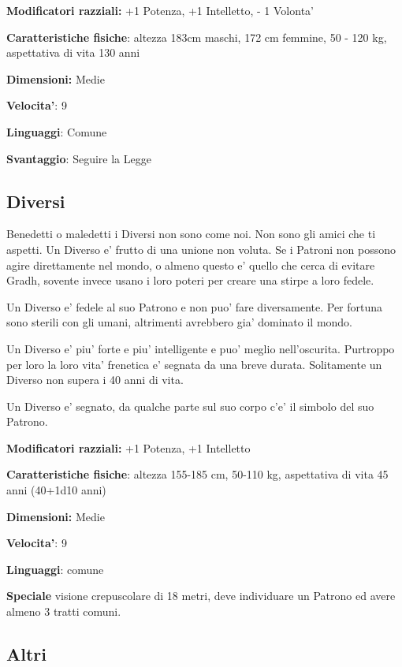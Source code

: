\documentclass[a4paper,11pt,twoside,openany]{book}
\begin{document}
\textbf{Modificatori razziali:} +1 Potenza, +1 Intelletto, - 1 Volonta'

\textbf{Caratteristiche fisiche}: altezza 183cm maschi, 172 cm femmine, 50 - 120 kg, aspettativa di vita 130 anni

\textbf{Dimensioni:} Medie

\textbf{Velocita'}: 9

\textbf{Linguaggi}: Comune

\textbf{Svantaggio}: Seguire la Legge

\subsection{Diversi}

\label{diversi}

Benedetti o maledetti i Diversi non sono come noi. Non sono gli amici che ti aspetti. Un Diverso e' frutto di una unione non voluta. Se i Patroni non possono agire direttamente nel mondo, o almeno questo e' quello che cerca di evitare Gradh, sovente invece usano i loro poteri per creare una stirpe a loro fedele.

Un Diverso e' fedele al suo Patrono e non puo' fare diversamente. Per fortuna sono sterili con gli umani, altrimenti avrebbero gia' dominato il mondo.

Un Diverso e' piu' forte e piu' intelligente e puo' meglio nell'oscurita. Purtroppo per loro la loro vita' frenetica e' segnata da una breve durata. Solitamente un Diverso non supera i 40 anni di vita.

Un Diverso e' segnato, da qualche parte sul suo corpo c'e' il simbolo del suo Patrono.

\textbf{Modificatori razziali:} +1 Potenza, +1 Intelletto

\textbf{Caratteristiche fisiche}: altezza 155-185 cm, 50-110 kg, aspettativa di vita 45 anni (40+1d10 anni)

\textbf{Dimensioni:} Medie

\textbf{Velocita'}: 9

\textbf{Linguaggi}: comune

\textbf{Speciale} visione crepuscolare di 18 metri, deve individuare un Patrono ed avere almeno 3 tratti comuni.

\subsection{Altri}

\label{altri}
\end{document}
